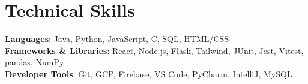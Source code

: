 \documentclass[letterpaper,11pt]{article}
\begin{document}
%
\section{Technical Skills}
 \begin{itemize}[leftmargin=0.15in, label={}]
    \small{\item{
     \textbf{Languages}{: Java, Python, JavaScript, C, SQL, HTML/CSS} \\
     \textbf{Frameworks \& Libraries}{: React, Node.js, Flask, Tailwind, JUnit, Jest, Vitest, pandas, NumPy } \\
     \textbf{Developer Tools}{: Git, GCP, Firebase, VS Code, PyCharm, IntelliJ, MySQL} \\
    }}
 \end{itemize}


\end{document}
